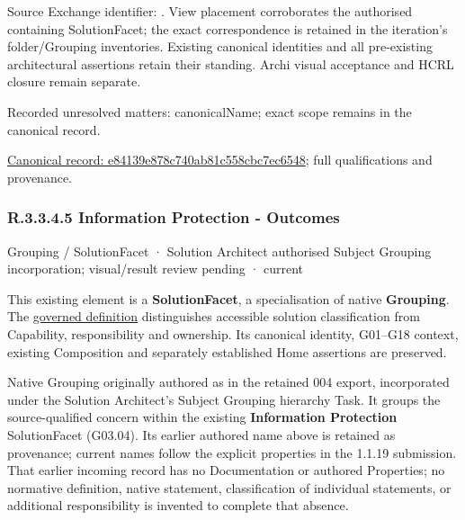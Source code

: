 Source Exchange identifier: \texttt{}. View placement corroborates
the authorised containing SolutionFacet; the exact correspondence is retained in the
iteration's folder/Grouping inventories. Existing canonical identities and all
pre-existing architectural assertions retain their standing. Archi visual
acceptance and HCRL closure remain separate.


{\small Recorded unresolved matters: canonicalName; exact scope remains in the canonical record.}\par
{\footnotesize \href{../../../../../../../continuum/grouping/e84139e878c740ab81c558cbc7ec6548.md}{Canonical record: e84139e878c740ab81c558cbc7ec6548}; full qualifications and provenance.}\par
\subsubsection*{R.3.3.4.5 Information Protection - Outcomes}
\label{navigation:R.3.3.4.5}

\label{element:b6ff7b82c59e4125868902e34d89630d}
{\small Grouping / SolutionFacet · Solution Architect authorised Subject Grouping incorporation; visual/result review pending · current}\par

This existing element is a \textbf{SolutionFacet}, a specialisation of native
\textbf{Grouping}. The \href{\detokenize{../../../../../../../governance/continuum-representation.md#solutionfacet-classification--1119-candidate}}{governed definition}
distinguishes accessible solution classification from Capability, responsibility
and ownership. Its canonical identity, G01–G18 context, existing Composition
and separately established Home assertions are preserved.



Native Grouping originally authored as \texttt{} in the retained 004 export,
incorporated under the Solution Architect's Subject Grouping hierarchy Task.
It groups the source-qualified \texttt{} concern within
the existing \textbf{Information Protection} SolutionFacet (G03.04). Its earlier authored name above is retained as provenance; current names
follow the explicit properties in the 1.1.19 submission.
That earlier incoming record has no Documentation or authored Properties; no normative
definition, native statement, classification of individual statements, or
additional responsibility is invented to complete that absence.



